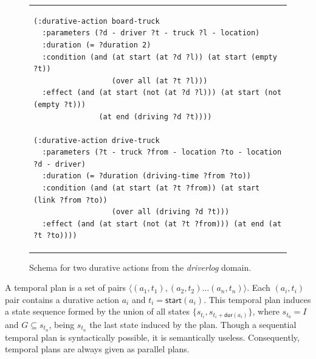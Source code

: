 \documentclass[runningheads]{llncs}
\newcommand{\tup}[1]{{\langle #1 \rangle}}
\newcommand{\dur}{\mathsf{dur}}    %
\newcommand{\start}{\mathsf{start}}%
\newcommand{\til}{\mathsf{til}}    %
\begin{document}
\begin{figure}
\begin{tabular}{p{\textwidth}}
\begin{verbatim}
(:durative-action board-truck
  :parameters (?d - driver ?t - truck ?l - location)
  :duration (= ?duration 2)
  :condition (and (at start (at ?d ?l)) (at start (empty ?t))
                  (over all (at ?t ?l)))
  :effect (and (at start (not (at ?d ?l))) (at start (not (empty ?t)))
               (at end (driving ?d ?t))))

(:durative-action drive-truck
  :parameters (?t - truck ?from - location ?to - location ?d - driver)
  :duration (= ?duration (driving-time ?from ?to))
  :condition (and (at start (at ?t ?from)) (at start (link ?from ?to))
                  (over all (driving ?d ?t)))
  :effect (and (at start (not (at ?t ?from))) (at end (at ?t ?to))))
\end{verbatim}
\end{tabular}
\caption{\small Schema for two durative actions from the {\em driverlog} domain.}
\label{fig:exampleactions2}
\end{figure}





A temporal plan is a set of pairs $\tup{(a_1,t_1),(a_2,t_2)\ldots (a_n,t_n)}$. Each $(a_i,t_i)$ pair contains a durative action $a_i$ and $t_i=\start(a_i)$.
This temporal plan induces a state sequence formed by the union of all states $\{s_{t_i}, s_{t_i+\dur(a_i)}\}$, where $s_{t_0}=I$ and $G\subseteq s_{t_n}$, being $s_{t_n}$ the last state induced by the plan.
Though a sequential temporal plan is syntactically possible, it is semantically useless. Consequently, temporal plans are always given as parallel plans.
\end{document}
